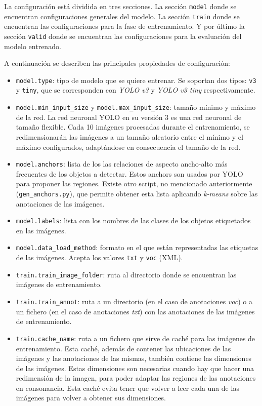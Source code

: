 La configuración está dividida en tres secciones. La sección \texttt{model} donde se encuentran configuraciones generales del modelo. La sección \texttt{train} donde se encuentran las configuraciones para la fase de entrenamiento. Y por último la sección \texttt{valid} donde se encuentran las configuraciones para la evaluación del modelo entrenado.

A continuación se describen las principales propiedades de configuración:

\begin{itemize}
	\item \texttt{model.type}: tipo de modelo que se quiere entrenar. Se soportan dos tipos: \texttt{v3} y \texttt{tiny}, que se corresponden con \textit{YOLO v3} y \textit{YOLO v3 tiny} respectivamente.
	\item \texttt{model.min\_input\_size} y \texttt{model.max\_input\_size}: tamaño mínimo y máximo de la red. La red neuronal YOLO en su versión 3 es una red neuronal de tamaño flexible. Cada 10 imágenes procesadas durante el entrenamiento, se redimensionarán las imágenes a un tamaño aleatorio entre el mínimo y el máximo configurados, adaptándose en consecuencia el tamaño de la red.
	\item \texttt{model.anchors}: lista de los las relaciones de aspecto ancho-alto más frecuentes de los objetos a detectar. Estos anchors son usados por YOLO para proponer las regiones. Existe otro script, no mencionado anteriormente (\texttt{gen\_anchors.py}), que permite obtener esta lista aplicando \textit{k-means} sobre las anotaciones de las imágenes.
	\item \texttt{model.labels}: lista con los nombres de las clases de los objetos etiquetados en las imágenes.
	\item \texttt{model.data\_load\_method}: formato en el que están representadas las etiquetas de las imágenes. Acepta los valores \texttt{txt} y \texttt{voc} (XML).
	\item \texttt{train.train\_image\_folder}: ruta al directorio donde se encuentran las imágenes de entrenamiento.
	\item \texttt{train.train\_annot}: ruta a un directorio (en el caso de anotaciones \textit{voc}) o a un fichero (en el caso de anotaciones \textit{txt}) con las anotaciones de las imágenes de entrenamiento.
	\item \texttt{train.cache\_name}: ruta a un fichero que sirve de caché para las imágenes de entrenamiento. Esta caché, además de contener las ubicaciones de las imágenes y las anotaciones de las mismas, también contiene las dimensiones de las imágenes. Estas dimensiones son necesarias cuando hay que hacer una redimensión de la imagen, para poder adaptar las regiones de las anotaciones en consonancia. Esta caché evita tener que volver a leer cada una de las imágenes para volver a obtener sus dimensiones.

\end{itemize}
